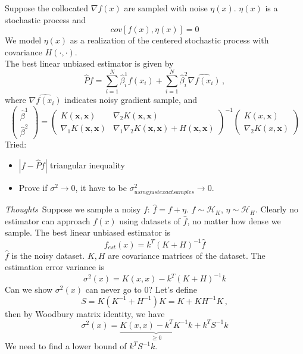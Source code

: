 \documentclass[a4paper,onecolumn]{article}
\begin{document}
\noindent Suppose the collocated $\nabla f(x)$ are sampled with noise $\eta(x)$. $\eta(x)$ is a stochastic process and
$$
    cov[f(x), \eta(x)] = 0
$$
We model $\eta(x)$ as a realization of the centered stochastic process with covariance $H(\cdot, \cdot)$.\\
The best linear unbiased estimator is given by
$$
    \hat{P}f = \sum_{i=1}^N \hat{\beta}_i^1 f(x_i) + \sum_{i=1}^N \hat{\beta}_i^2 \widehat{\nabla f(x_i)}\,,
$$
where $\widehat{\nabla f(x_i)}$ indicates noisy gradient sample, and
\begin{equation*}
    \begin{pmatrix}
        \hat{\beta}^1\\
        \hat{\beta}^2
    \end{pmatrix}
    = 
    \begin{pmatrix}
        K(\mathbf{x}, \mathbf{x}) & \nabla_2 K(\mathbf{x}, \mathbf{x})\\
        \nabla_1 K(\mathbf{x}, \mathbf{x}) & \nabla_1 \nabla_2 K(\mathbf{x},\mathbf{x})+H(\mathbf{x},\mathbf{x})
    \end{pmatrix}^{-1}
    \begin{pmatrix}
        K(x,\mathbf{x})\\
        \nabla_2 K(x, \mathbf{x})
    \end{pmatrix}
\end{equation*}
Tried:
\begin{itemize}
    \item $|f-\hat{P}f|$ triangular inequality
    \item Prove if $\sigma^2\rightarrow 0$, it have to be $\sigma^2_{using just exact samples} \rightarrow 0$.
\end{itemize}
\emph{Thoughts} $\,$Suppose we sample a noisy $f$: $\hat{f} = f+\eta$. $f\sim \mathcal{H}_{K}$, $\eta\sim \mathcal{H}_H$.
Clearly no estimator can approach $f(x)$ using datasets of $\hat{f}$, no matter how dense we sample. The best linear unbiased estimator
is 
$$
    f_{est}(x) = k^T (K+H)^{-1} \hat{f}
$$
$\hat{f}$ is the noisy dataset. $K,H$ are covariance matrices of the dataset. The estimation error variance is
$$
    \sigma^2(x) = K(x,x) - k^T (K+H)^{-1} k
$$
Can we show $\sigma^2(x)$ can never go to 0? Let's define
$$
    S = K(K^{-1}+ H^{-1}) K = K + KH^{-1}K\,,
$$
then by Woodbury matrix identity, we have
$$
    \sigma^2(x) = \underbrace{K(x,x) - k^T K^{-1} k}_{\ge 0} + k^T S^{-1} k
$$
We need to find a lower bound of $k^T S^{-1} k$.\\
\end{document}
